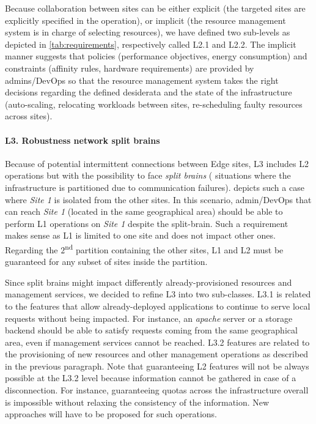 Because collaboration between sites can be either explicit (\ie the
targeted sites are explicitly specified in the operation), or implicit
(\ie the resource management system is in charge of selecting
resources), we have defined two sub-levels as depicted in
\cref{tab:requirements}, respectively called L2.1 and L2.2. The implicit
manner suggests that policies (\eg performance objectives, energy
consumption) and constraints (\eg affinity rules, hardware requirements) are
provided by admins/DevOps so that the resource management system takes the
right decisions regarding the defined desiderata and the state of the
infrastructure (\eg auto-scaling, relocating workloads between sites,
re-scheduling faulty resources across sites).

\paragraph{L3. Robustness \wrt network split brains}
Because of potential intermittent connections between Edge sites, L3 includes
L2 operations but with the possibility to face \emph{split brains} (\ie
situations where the infrastructure is partitioned due to communication
failures).
%
 depicts such a case where \emph{Site 1} is isolated
from the other sites. In this scenario, admin/DevOps that can reach \emph{Site
1} (\ie located in the same geographical area) should be able to perform L1
operations on \emph{Site 1} despite the split-brain. Such a requirement
makes sense as L1 is limited to one site and does not impact other ones.
%
Regarding the $2$\textsuperscript{nd} partition containing the other sites, L1
and L2 must be guaranteed for any subset of sites inside the partition.

Since split brains might impact differently already-provisioned resources and
management services, we decided to refine L3 into two sub-classes. L3.1 is
related to the features that allow already-deployed applications to continue to
serve local requests without being impacted. For instance, an \emph{apache}
server or a storage backend should be able to satisfy requests coming from the
same geographical area, even if management services cannot be reached. L3.2
features are related to the provisioning of new resources and other management
operations as described in the previous paragraph.
%
Note that guaranteeing L2 features will not be always possible at the L3.2
level because information cannot be gathered in case of a disconnection. For
instance, guaranteeing quotas across the infrastructure overall is impossible
without relaxing the consistency of the information. New approaches will have
to be proposed for such operations.

